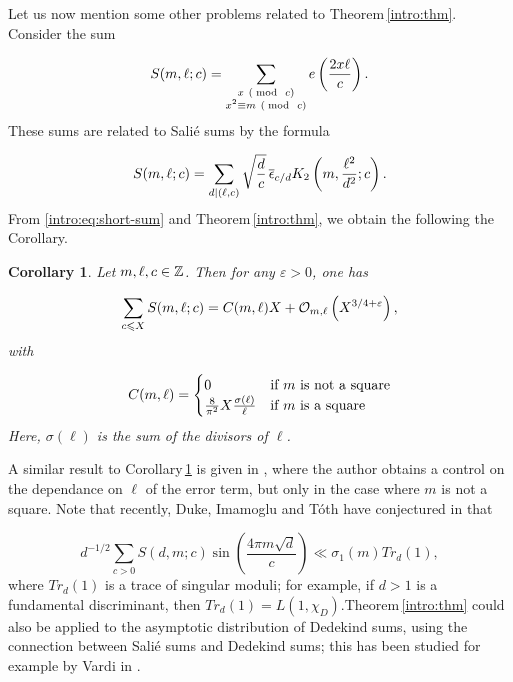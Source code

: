 \documentclass[leqno,10pt]{amsart}
\theoremstyle{plain}
\numberwithin{equation}{section}
\newtheorem{cor}[thm]{Corollary}
\theoremstyle{definition}
\theoremstyle{remark}
\begin{document}
Let us now mention some other problems related to Theorem\,\ref{intro:thm}. Consider the sum

\begin{equation}
S(m,\ell;c)= \sum_{\substack{x\ (\bmod\  c)\\ x^2\equiv m \ (\bmod\  c)}} e\left(\frac{2x\ell}{c}\right).
\end{equation}
These sums are related to Sali\'e sums by the formula

\begin{equation}\label{intro:eq:short-sum}
S(m,\ell;c) = \sum_{d\vert (\ell,c)} \sqrt{\frac{d}{c}} \, \overline{\epsilon}_{c/d} K_2\left(m,\frac{\ell^2}{d^2};c\right).
\end{equation}
From \eqref{intro:eq:short-sum} and Theorem\,\ref{intro:thm}, we obtain the following the Corollary.

\begin{cor}\label{intro:cor}
Let $m,\ell,c\in\mathbb{Z}$. Then for any $\varepsilon>0$, one has

\begin{equation*}
\sum_{c\leqslant X} S(m,\ell;c) = C(m,\ell) X +\mathcal{O}_{m,\ell}\left(X^{3/4+\varepsilon}\right),
\end{equation*}
with 

\begin{equation*}
C(m,\ell)=
\begin{cases}
0&\textnormal{if $m$ is not a square}\\
\frac{8}{\pi^2} X\frac{\sigma(\ell)}{\ell} &\textnormal{if $m$ is a square}
\end{cases}
\end{equation*}
Here, $\sigma(\ell)$ is the sum of the divisors of $\ell$.
\end{cor}
A similar result to Corollary\,\ref{intro:cor} is given in \cite[Theorem\,1]{hoo:div-quadr-poly}, where the author obtains a control on the dependance on $\ell$ of the error term, but only in the case where $m$ is not a square. 
Note that recently, Duke, Imamoglu and T\'oth have conjectured in \cite{dit:cycle-mock} that 

\begin{equation}\label{conj}
d^{-1/2} \sum_{c>0} S(d,m;c) \sin\left(\frac{4\pi m\sqrt{d}}{c}\right) \ll \sigma_1(m) Tr_d(1),
\end{equation}
where $Tr_d(1)$ is a trace of singular moduli; for example, if $d>1$ is a fundamental discriminant, then $Tr_d (1) = L(1,\chi_D)$.Theorem\,\ref{intro:thm} could also be applied to the asymptotic distribution of Dedekind sums, using the connection between Sali\'e sums and Dedekind sums; this has been studied for example by Vardi in \cite{var:these}. \\ 
\end{document}
